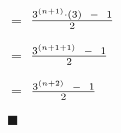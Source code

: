 \documentclass[12pt]{article}
\renewcommand{\qedsymbol}{$\blacksquare$}
\begin{document}
\hspace{7.7cm} $=$  {\LARGE{{$\frac{3^{(n+1)} \cdot (3) \hspace{0.2cm} - \hspace{0.2cm} 1}{2}$}}} \vspace{0.2cm}

\hspace{7.7cm} $=$  {\LARGE{{$\frac{3^{(n+1+1)} \hspace{0.2cm} - \hspace{0.2cm} 1}{2}$}}} \vspace{0.2cm}

\hspace{7.7cm} $=$  {\LARGE{{$\frac{3^{(n+2)} \hspace{0.2cm} - \hspace{0.2cm} 1}{2}$}}} \vspace{0.2cm}
 
\hspace{8cm} \qedsymbol \vspace{0.5cm}
\end{document}
